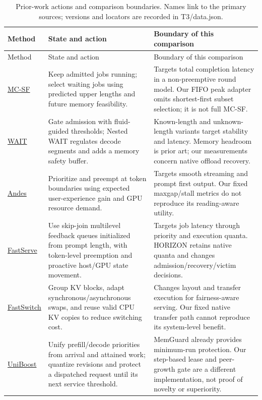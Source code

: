 \begingroup\small\setlength{\tabcolsep}{3pt}\renewcommand{\arraystretch}{1.15}
\begin{longtable}{>{\raggedright\arraybackslash}p{}>{\raggedright\arraybackslash}p{}>{\raggedright\arraybackslash}p{}}
\caption{Prior-work actions and comparison boundaries. Names link to the primary sources; versions and locators are recorded in T3/data.json.}\label{tab:prior}\\
\toprule Method & State and action & Boundary of this comparison \\ \midrule\endfirsthead
\toprule Method & State and action & Boundary of this comparison \\ \midrule\endhead
\href{https://arxiv.org/html/2502.07115v5}{MC-SF} & Keep admitted jobs running; select waiting jobs using predicted upper lengths and future memory feasibility. & Targets total completion latency in a non-preemptive round model. Our FIFO peak adapter omits shortest-first subset selection; it is not full MC-SF. \\
\href{https://arxiv.org/abs/2504.11320v4}{WAIT} & Gate admission with fluid-guided thresholds; Nested WAIT regulates decode segments and adds a memory safety buffer. & Known-length and unknown-length variants target stability and latency. Memory headroom is prior art; our measurements concern native offload recovery. \\
\href{https://arxiv.org/abs/2404.16283}{Andes} & Prioritize and preempt at token boundaries using expected user-experience gain and GPU resource demand. & Targets smooth streaming and prompt first output. Our fixed maxgap/stall metrics do not reproduce its reading-aware utility. \\
\href{https://arxiv.org/abs/2305.05920}{FastServe} & Use skip-join multilevel feedback queues initialized from prompt length, with token-level preemption and proactive host/GPU state movement. & Targets job latency through priority and execution quanta. HORIZON retains native quanta and changes admission/recovery/victim decisions. \\
\href{https://arxiv.org/html/2411.18424v1}{FastSwitch} & Group KV blocks, adapt synchronous/asynchronous swaps, and reuse valid CPU KV copies to reduce switching cost. & Changes layout and transfer execution for fairness-aware serving. Our fixed native transfer path cannot reproduce its system-level benefit. \\
\href{https://arxiv.org/html/2606.18431v1}{UniBoost} & Unify prefill/decode priorities from arrival and attained work; quantize revisions and protect a dispatched request until its next service threshold. & MemGuard already provides minimum-run protection. Our step-based lease and peer-growth gate are a different implementation, not proof of novelty or superiority. \\

\end{longtable}
